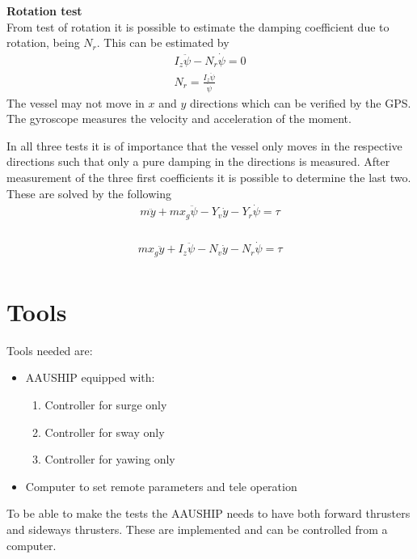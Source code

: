 \textbf{Rotation test}\\
From test of rotation it is possible to estimate the damping coefficient due to rotation, being $N_r$. This can be estimated by
\begin{align}
I_z\ddot \psi - N_r \dot \psi = 0\nonumber\\
N_r = \frac{I_z \ddot \psi}{\dot \psi}
\end{align}
The vessel may not move in $x$ and $y$ directions which can be verified by the \ac{GPS}. The gyroscope measures the velocity and acceleration of the moment.

In all three tests it is of importance that the vessel only moves in the respective directions such that only a pure damping in the directions is measured. After measurement of the three first coefficients it is possible to determine the last two. These are solved by the following
\begin{align}
m \ddot y + mx_g\ddot\psi - Y_v \dot y - Y_r \dot \psi = \tau\\
\end{align}

\begin{align}
mx_g \ddot y + I_z\ddot \psi - N_v \dot y - N_r \dot \psi = \tau\\
\end{align}


\section{Tools}
Tools needed are:
\begin{itemize}
	\item AAUSHIP equipped with:
		\begin{enumerate}
			\item Controller for surge only
			\item Controller for sway only
			\item Controller for yawing only
		\end{enumerate}
	\item Computer to set remote parameters and tele operation
\end{itemize}
To be able to make the tests the AAUSHIP needs to have both forward thrusters and sideways thrusters. These are implemented and can be controlled from a computer.

